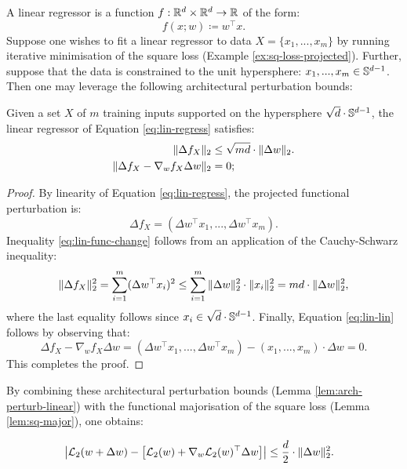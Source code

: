 \begin{refsection}
A linear regressor is a function $f:\mathbb{R}^d \times \mathbb{R}^d \to \mathbb{R}$ of the form:
\begin{equation}\label{eq:lin-regress}
    f(x;w) \coloneqq w^\top x.
\end{equation}
Suppose one wishes to fit a linear regressor to data $X=\{x_1,...,x_m\}$ by running iterative minimisation of the square loss (Example \ref{ex:sq-loss-projected}). Further, suppose that the data is constrained to the unit hypersphere: $x_1,...,x_m \in \mathbb{S}^{d-1}$. Then one may leverage the following architectural perturbation bounds:

\begin{lemma}\label{lem:arch-perturb-linear} Given a set $X$ of $m$ training inputs supported on the hypersphere $\sqrt{d}\cdot\mathbb{S}^{d-1}$, the linear regressor of Equation \ref{eq:lin-regress} satisfies:
\begin{align}
    \|\Delta f_X\|_2 &\leq \sqrt{md} \cdot \Vert {\Delta w} \Vert_2. \label{eq:lin-func-change} \\
    \Vert {\Delta f_X - \nabla_w f_X \Delta w} \Vert_2 &= 0; \label{eq:lin-lin}
\end{align}
\end{lemma}
\begin{proof}
By linearity of Equation \ref{eq:lin-regress}, the projected functional perturbation is:
\begin{equation*}
    \Delta f_X = (\Delta w^\top x_1, ..., \Delta w^\top x_m).
\end{equation*}
Inequality \ref{eq:lin-func-change} follows from an application of the Cauchy-Schwarz inequality:
\begin{equation*}
    \Vert {\Delta f_X} \Vert_2^2 = \sum_{i=1}^m (\Delta w^\top x_i)^2 \leq \sum_{i=1}^m \Vert {\Delta w} \Vert_2^2\cdot\Vert {x_i} \Vert_2^2 = md \cdot \Vert {\Delta w} \Vert_2^2,
\end{equation*}
where the last equality follows since $x_i \in \sqrt{d}\cdot \mathbb{S}^{d-1}$. Finally, Equation \ref{eq:lin-lin} follows by observing that:
\begin{equation*}
    \Delta f_X - \nabla_w f_X \Delta w= (\Delta w^\top x_1, ..., \Delta w^\top x_m) - (x_1,...,x_m)\cdot\Delta w = 0.
\end{equation*}
This completes the proof.
\end{proof}

By combining these architectural perturbation bounds (Lemma \ref{lem:arch-perturb-linear}) with the functional majorisation of the square loss (Lemma \ref{lem:sq-major}), one obtains:
\begin{theorem}
\begin{align}
        &\left|\mathcal{L}_2(w+\Delta w) -\left[ \mathcal{L}_2(w) + \nabla_w\mathcal{L}_2(w)^\top \Delta w\right]\right| \leq \frac{d}{2}\cdot \|\Delta w\|_2^2.
    \end{align}
\end{theorem}


\end{refsection}

